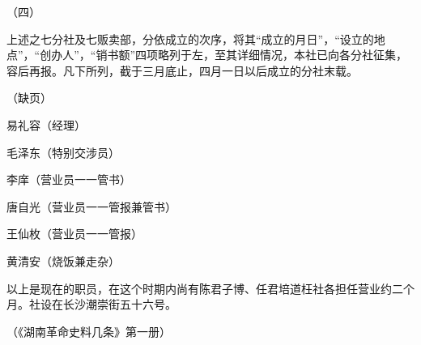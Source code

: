 （四）

上述之七分社及七贩卖部，分依成立的次序，将其“成立的月日”，“设立的地点”，“创办人”，“销书额”四项略列于左，至其详细情况，本社已向各分社征集，容后再报。凡下所列，截于三月底止，四月一日以后成立的分社末载。

（缺页）

易礼容（经理）

毛泽东（特别交涉员）

李庠（营业员一一管书）

唐自光（营业员一一管报兼管书）

王仙枚（营业员一一管报）

黄清安（烧饭兼走杂）

以上是现在的职员，在这个时期内尚有陈君子博、任君培道枉社各担任营业约二个月。社设在长沙潮崇街五十六号。

\begin{flushright}（《湖南革命史料几条》第一册）\end{flushright}

